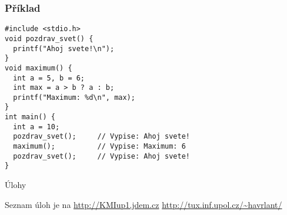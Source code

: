 \documentclass{beamer}
\begin{document}
\begin{frame}[t,fragile]\frametitle{Příklad} 
\begin{verbatim} 
#include <stdio.h>
void pozdrav_svet() {
  printf("Ahoj svete!\n");
}
void maximum() {
  int a = 5, b = 6;
  int max = a > b ? a : b;
  printf("Maximum: %d\n", max);
}
int main() {
  int a = 10;
  pozdrav_svet();     // Vypise: Ahoj svete!
  maximum();          // Vypise: Maximum: 6
  pozdrav_svet();     // Vypise: Ahoj svete!
}
\end{verbatim}
\end{frame}

\begin{frame}[t,fragile]{Úlohy}
\begin{center}
\vskip 1cm
{\Large Seznam úloh je na \url{http://KMIup1.jdem.cz}}
\vskip 2cm
\url{http://tux.inf.upol.cz/~havrlant/}
\end{center}
\end{frame}
\end{document}
